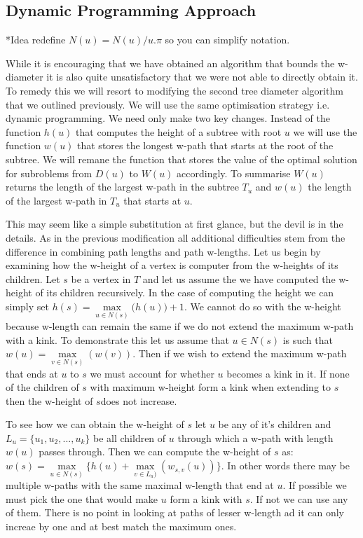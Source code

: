 \subsection{Dynamic Programming Approach}

*Idea redefine $N(u) = N(u) / u.\pi$ so you can simplify notation.

While it is encouraging that we have obtained an algorithm that bounds the w-diameter it is also quite unsatisfactory that we were not able to directly obtain it. To remedy this we will resort to modifying the second tree diameter algorithm that we outlined previously. We will use the same optimisation strategy i.e. dynamic programming. We need only make two key changes. Instead of the function $h(u)$ that computes the height of a subtree with root $u$ we will use the function $w(u)$ that stores the longest w-path that starts at the root of the subtree. We will remane the function that stores the value of the optimal solution for subroblems from $D(u)$ to $W(u)$ accordingly. To summarise $W(u)$ returns the length of the largest w-path in the subtree $T_u$ and $w(u)$ the length of the largest w-path in $T_u$ that starts at $u$.

This may seem like a simple substitution at first glance, but the devil is in the details. As in the previous modification all additional difficulties stem from the difference in combining path lengths and path w-lengths. Let us begin by examining how the w-height of a vertex is computer from the w-heights of its children. Let $s$ be a vertex in $T$ and let us assume the we have computed the w-height of its children recursively. In the case of computing the height we can simply set $h(s) = \max\limits_{u \in N(s)}\big( h(u) \big) + 1$. We cannot do so with the w-height because w-length can remain the same if we do not extend the maximum w-path with a kink.  To demonstrate this let us assume that $u \in N(s)$ is such that $w(u) = \max\limits_{v \in N(s)}(w(v))$. Then if we wish to extend the maximum w-path that ends at $u$ to $s$ we must account for whether $u$ becomes a kink in it. If none of the children of $s$ with maximum w-height form a kink when extending to $s$ then the w-height of $s$does not increase.

To see how we can obtain the w-height of $s$ let $u$ be any of it's children and $L_u = \{u_1, u_2, ..., u_k\}$ be all children of $u$ through which a w-path with length $w(u)$ passes through. Then we can compute the w-height of $s$ as: $w(s) = \max\limits_{u \in N(s)}\{ h(u) + \max\limits_{v \in L_u)}(w_{s, v}(u)) \}$. In other words there may be multiple w-paths with the same maximal w-length that end at $u$. If possible we must pick the one that would make $u$ form a kink with $s$. If not we can use any of them. There is no point in looking at paths of lesser w-length ad it can only increae by one and at best match the maximum ones.


